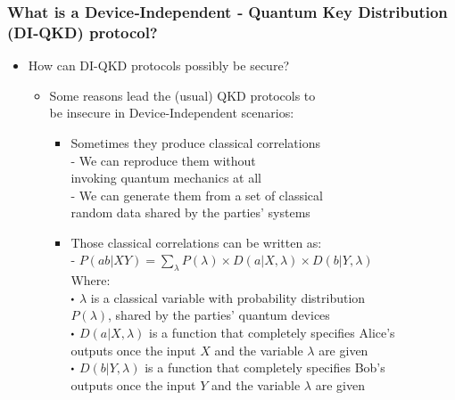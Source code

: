 \documentclass{beamer}
\newcommand\sbullet[1][.5]{\mathbin{\vcenter{\hbox{\scalebox{#1}{$\bullet$}}}}}
\begin{document}
		\begin{frame}
			\frametitle{\footnotesize What is a Device‑Independent ‑ Quantum Key Distribution (DI‑QKD) protocol?}

            \vspace{2.5ex}
            \begin{itemize}
                \item How can DI-QKD protocols possibly be secure?
                \begin{itemize}
                    \item Some reasons lead the (usual) QKD protocols to\\ be insecure in Device-Independent scenarios:
                    \begin{itemize}
                        \item Sometimes they produce classical correlations\\
                        - We can reproduce them without\\\hspace{0.5em}invoking quantum mechanics at all\\
                        - We can generate them from a set of classical\\\hspace{0.5em}random data shared by the parties' systems
                        \vspace{1.5ex}
                        \item Those classical correlations can be written as:\\
                        - $P(ab|XY) = \sum_{\lambda} P(\lambda) \times D(a|X,\lambda) \times D(b|Y,\lambda)$\\
                        \vspace{0.75ex}\scriptsize
                        \hspace{0.6em}Where:\\
                        \hspace{0.75em}$\sbullet$ $\lambda$ is a classical variable with probability distribution\\
                        \hspace{1.15em}$P(\lambda)$, shared by the parties' quantum devices\\
                        \hspace{0.75em}$\sbullet$ $D(a|X,\lambda)$ is a function that completely specifies Alice's\\
                        \hspace{1.15em}outputs once the input $X$ and the variable $\lambda$ are given\\
                        \hspace{0.75em}$\sbullet$ $D(b|Y,\lambda)$ is a function that completely specifies Bob's\\
                        \hspace{1.15em}outputs once the input $Y$ and the variable $\lambda$ are given
                    \end{itemize}
                \end{itemize}
            \end{itemize}
		\end{frame}
\end{document}
